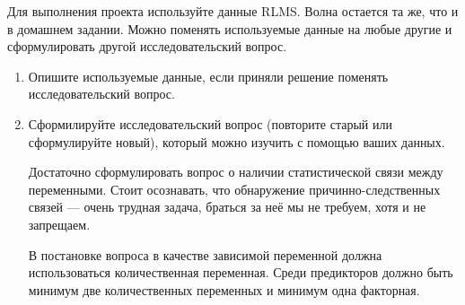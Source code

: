 \documentclass[12pt]{article}
\begin{document}


Для выполнения проекта используйте данные RLMS. Волна остается та же, что и в домашнем задании. Можно поменять используемые данные на любые другие и сформулировать другой исследовательский вопрос. 

\begin{enumerate}



\item Опишите используемые данные, если приняли решение поменять исследовательский вопрос. 

\item Сформилируйте исследовательский вопрос (повторите старый или сформулируйте новый), который можно изучить с помощью ваших данных.

Достаточно сформулировать вопрос о наличии статистической связи между переменными. Стоит осознавать, что обнаружение причинно-следственных связей — очень трудная задача, браться за неё мы не требуем, хотя и не запрещаем.

В постановке вопроса в качестве зависимой переменной должна использоваться количественная переменная. Среди предикторов должно быть минимум две количественных переменных и минимум одна факторная.



\end{enumerate}
\end{document}
